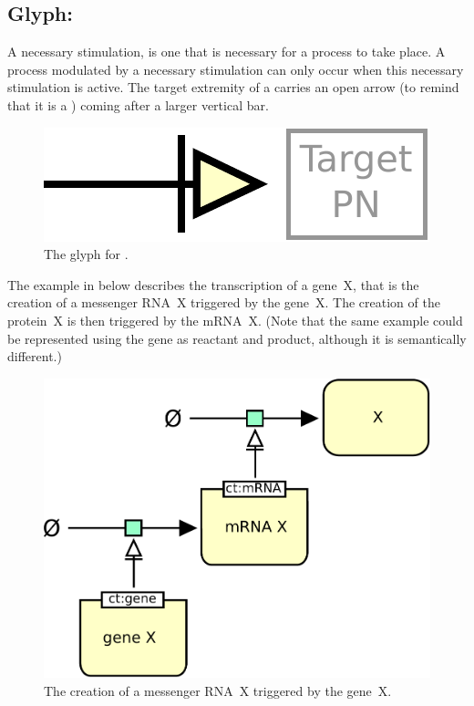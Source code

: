 

\subsection{Glyph: }\label{sec:necessary_stim}

A necessary stimulation, is one that is necessary for a process to take place. A process modulated by a necessary stimulation can only occur when this necessary stimulation is active. The target extremity of a  carries an open arrow (to remind that it is a ) coming after a larger vertical bar.

\begin{figure}[H]
  \centering
  \includegraphics[scale = 0.5]{images/necessary_stim}
  \caption{The \PD glyph for .}
  \label{fig:Necessary Stimulation}
\end{figure}

The example in  below describes the transcription of a gene~X, that is the creation of a messenger RNA~X triggered by the gene~X.  The creation of the protein~X is then triggered by the mRNA~X.  (Note that the same example could be represented using the gene as reactant and product, although it is semantically different.)

\begin{figure}[H]
  \centering
  \includegraphics[scale = 0.5]{images/necessary_stim-genetic}
  \caption{The creation of a messenger RNA~X triggered by the gene~X.}
  \label{fig:necessary_stim-gene}
\end{figure}


